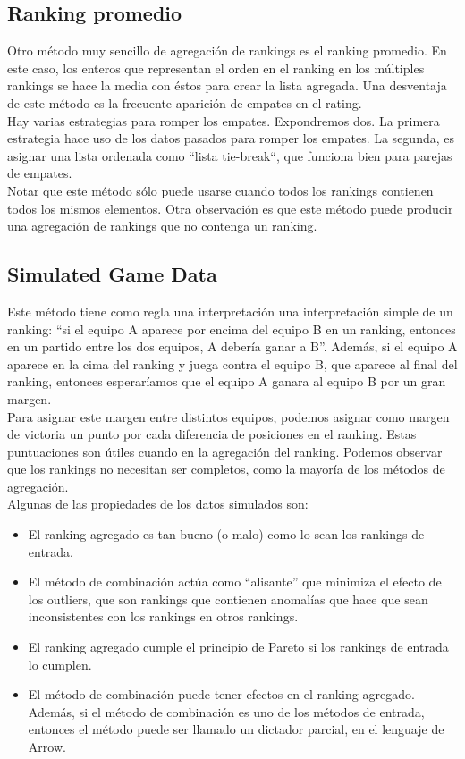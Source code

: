 \subsection{Ranking promedio}  

Otro método muy sencillo de agregación de rankings es el ranking promedio. En este caso, los enteros que representan el orden en el ranking en los múltiples rankings se hace la media con éstos para crear la lista agregada. Una desventaja de este método es la frecuente aparición de empates en el rating. \\

Hay varias estrategias para romper los empates. Expondremos dos. La primera estrategia hace uso de los datos pasados para romper los empates. La segunda, es asignar una lista ordenada como ``lista tie-break``, que funciona bien para parejas de empates.\\

Notar que este método sólo puede usarse cuando todos los rankings contienen todos los mismos elementos. Otra observación es que este método puede producir una agregación de rankings que no contenga un ranking. 

\subsection{Simulated Game Data}

Este método tiene como regla una interpretación una interpretación simple de un ranking: ``si el equipo A aparece por encima del equipo B en un ranking, entonces en un partido entre los dos equipos, A debería ganar a B''. Además, si el equipo A aparece en la cima del ranking y juega contra el equipo B, que aparece al final del ranking, entonces esperaríamos que el equipo A ganara al equipo B por un gran margen.\\

Para asignar este margen entre distintos equipos, podemos asignar como margen de victoria un punto por cada diferencia de posiciones en el ranking. Estas puntuaciones son útiles cuando en la agregación del ranking. Podemos observar que los rankings no necesitan ser completos, como la mayoría de los métodos de agregación.\\

Algunas de las propiedades de los datos simulados son:

\begin{itemize}
\item El ranking agregado es tan bueno (o malo) como lo sean los rankings de entrada.
\item El método de combinación actúa como ``alisante'' que minimiza el efecto de los outliers, que son rankings que contienen  anomalías que hace que sean inconsistentes con los rankings en otros rankings. 
\item El ranking agregado cumple el principio de Pareto si los rankings de entrada lo cumplen.
\item El método de combinación puede tener efectos en el ranking agregado. Además, si el método de combinación es uno de los métodos de entrada, entonces el método puede ser llamado un dictador parcial, en el lenguaje de Arrow.    
\end{itemize}
 